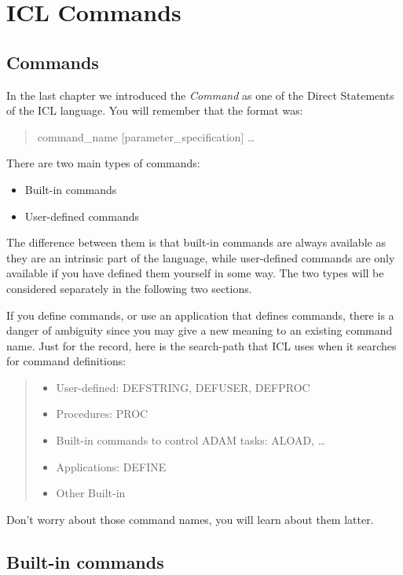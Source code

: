 \chapter{ICL Commands}
\label{C_commands}

\section{Commands}
\label{S_commands}

In the last chapter we introduced the {\em Command} as one of the Direct
Statements of the ICL language.
You will remember that the format was:
\begin{quote}
command\_name [parameter\_specification] \ldots
\end{quote}
There are two main types of commands:
\begin{itemize}
\item Built-in commands
\item User-defined commands
\end{itemize}
The difference between them is that built-in commands are always available
as they are an intrinsic part of the language, while user-defined commands
are only available if you have defined them yourself in some way.
The two types will be considered separately in the following two sections.

If you define commands, or use an application that defines commands, there is
a danger of ambiguity since you may give a new meaning to an existing command
name.
Just for the record, here is the search-path that ICL uses when it searches
for command definitions:
\begin{quote}
\begin{itemize}
\item User-defined: DEFSTRING, DEFUSER, DEFPROC
\item Procedures: PROC
\item Built-in commands to control ADAM tasks: ALOAD, \ldots
\item Applications: DEFINE
\item Other Built-in
\end{itemize}
\end{quote}
Don't worry about those command names, you will learn about them latter.

\section{Built-in commands}
\label{S_bic}

